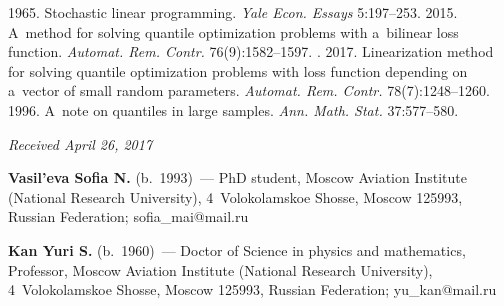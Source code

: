 \begin{multicols}{2}
{{\begin{thebibliography}{99}
 1965. Stochastic linear programming.
\textit{Yale Econ. Essays} 5:197--253.
 2015.
 A~method for solving quantile optimization problems with a~bilinear loss function.
 \textit{Automat. Rem. Contr.} 76(9):1582--1597.
. 2017. 
Linearization method for solving quantile optimization problems 
with loss function depending on a~vector of small random parameters.
\textit{Automat. Rem. Contr.} 78(7):1248--1260.
 1996. A~note on quantiles in large samples.
\textit{Ann. Math. Stat.} 37:577--580.
\end{thebibliography}

 }
 }

\end{multicols}

\vspace*{-3pt}

\hfill{\small\textit{Received April 26, 2017}}


\Contr


\noindent
\textbf{Vasil'eva Sofia N.} (b.\ 1993)~--- 
PhD student, Moscow Aviation Institute (National Research University), 
4~Volokolamskoe  Shosse, Moscow 125993, Russian Federation; 
\mbox{sofia\_mai@mail.ru}

\vspace*{3pt}

\noindent
\textbf{Kan Yuri S.} (b.\ 1960)~--- 
Doctor of Science in physics and mathematics, 
Professor, Moscow Aviation Institute (National Research University), 
4~Volokolamskoe  Shosse, Moscow 125993, Russian Federation; \mbox{yu\_kan@mail.ru}

\label{end\stat}


\renewcommand{\bibname}{\protect\rm Литература} 